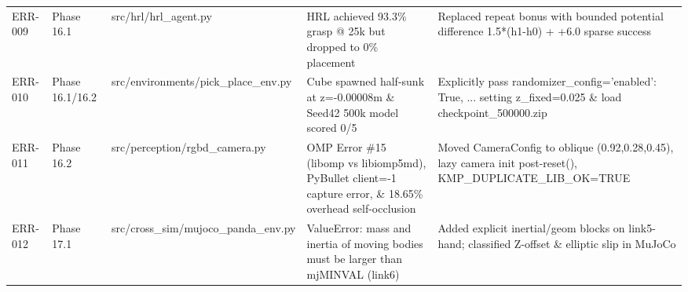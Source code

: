 \begin{longtable}{l l l l l}
ERR-009 & Phase 16.1 & src/hrl/hrl\_agent.py & HRL achieved 93.3\% grasp @ 25k but dropped to 0\% placement & Replaced repeat bonus with bounded potential difference 1.5*(h1-h0) + +6.0 sparse success \\
ERR-010 & Phase 16.1/16.2 & src/environments/pick\_place\_env.py & Cube spawned half-sunk at z=-0.00008m \& Seed42 500k model scored 0/5 & Explicitly pass randomizer\_config={'enabled': True, ...} setting z\_fixed=0.025 \& load checkpoint\_500000.zip \\
ERR-011 & Phase 16.2 & src/perception/rgbd\_camera.py & OMP Error \#15 (libomp vs libiomp5md), PyBullet client=-1 capture error, \& 18.65\% overhead self-occlusion & Moved CameraConfig to oblique (0.92,0.28,0.45), lazy camera init post-reset(), KMP\_DUPLICATE\_LIB\_OK=TRUE \\
ERR-012 & Phase 17.1 & src/cross\_sim/mujoco\_panda\_env.py & ValueError: mass and inertia of moving bodies must be larger than mjMINVAL (link6) & Added explicit inertial/geom blocks on link5-hand; classified Z-offset \& elliptic slip in MuJoCo \\
\bottomrule \end{longtable}